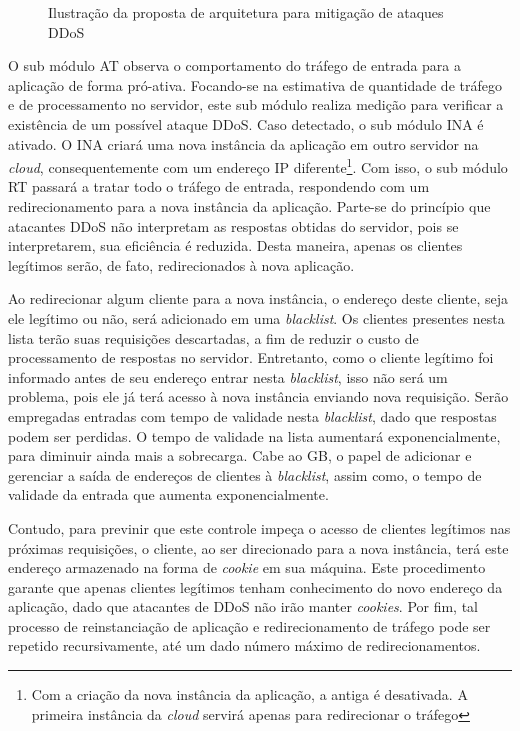 \begin{figure}[b!]
\centering
\caption{Ilustração da proposta de arquitetura para mitigação de ataques DDoS}
\label{fig:arq}
\end{figure}



O sub módulo AT observa o comportamento do tráfego de entrada para a aplicação de forma pró-ativa. Focando-se na estimativa de quantidade de tráfego e de processamento no servidor, este sub módulo realiza medição para verificar a existência de um possível ataque DDoS. Caso detectado, o sub módulo INA é ativado. O INA criará uma nova instância da aplicação em outro servidor na \emph{cloud}, consequentemente com um endereço IP diferente\footnote{Com a criação da nova instância da aplicação, a antiga é desativada. A primeira instância da \emph{cloud} servirá apenas para redirecionar o tráfego}. Com isso, o sub módulo RT passará a tratar todo o tráfego de entrada, respondendo com um redirecionamento para a nova instância da aplicação. Parte-se do princípio que atacantes DDoS não interpretam as respostas obtidas do servidor, pois se interpretarem, sua eficiência é reduzida. Desta maneira, apenas os clientes legítimos serão, de fato, redirecionados à nova aplicação.

Ao redirecionar algum cliente para a nova instância, o endereço deste cliente, seja ele legítimo ou não, será adicionado em uma \emph{blacklist}. Os clientes presentes nesta lista terão suas requisições descartadas, a fim de reduzir o custo de processamento de respostas no servidor. Entretanto, como o cliente legítimo foi informado antes de seu endereço entrar nesta \emph{blacklist}, isso não será um problema, pois ele já terá acesso à nova instância enviando nova requisição. Serão empregadas entradas com tempo de validade nesta \emph{blacklist}, dado que respostas podem ser perdidas. O tempo de validade na lista aumentará exponencialmente, para diminuir ainda mais a sobrecarga. Cabe ao GB, o papel de adicionar e gerenciar a saída de endereços de clientes à \emph{blacklist}, assim como, o tempo de validade da entrada que aumenta exponencialmente.

Contudo, para previnir que este controle impeça o acesso de clientes legítimos nas próximas requisições, o cliente, ao ser direcionado para a nova instância, terá este endereço armazenado na forma de \emph{cookie} em sua máquina. Este procedimento garante que apenas clientes legítimos tenham conhecimento do novo endereço da aplicação, dado que atacantes de DDoS não irão manter \emph{cookies}. Por fim,  tal processo de reinstanciação de aplicação e redirecionamento de tráfego pode ser repetido recursivamente, até um dado número máximo de redirecionamentos.
